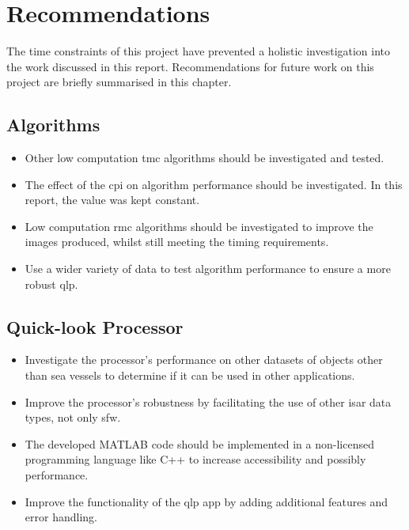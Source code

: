 \documentclass[class=report,11pt,crop=false]{standalone}
\begin{document}
\chapter{Recommendations \label{ch:recommendations}}
The time constraints of this project have prevented a holistic investigation into the work discussed in this report. Recommendations for future work on this project are briefly summarised in this chapter.

\section{Algorithms}
\begin{itemize}
    \item Other low computation \gls{tmc} algorithms should be investigated and tested.
    \item The effect of the \gls{cpi} on algorithm performance should be investigated. In this report, the value was kept constant.
    \item Low computation \gls{rmc} algorithms should be investigated to improve the images produced, whilst still meeting the timing requirements.
    \item Use a wider variety of data to test algorithm performance to ensure a more robust \gls{qlp}.
\end{itemize}
\section{Quick-look Processor}
\begin{itemize}
    \item Investigate the processor's performance on other datasets of objects other than sea vessels to determine if it can be used in other applications.
    \item Improve the processor's robustness by facilitating the use of other \gls{isar} data types, not only \gls{sfw}.
    \item The developed \textsc{MATLAB} code should be implemented in a non-licensed programming language like C++ to increase accessibility and possibly performance.
    \item Improve the functionality of the \gls{qlp} app by adding additional features and error handling.
\end{itemize}


\ifstandalone

\printnoidxglossary[type=\acronymtype,nonumberlist]
\fi
\end{document}
